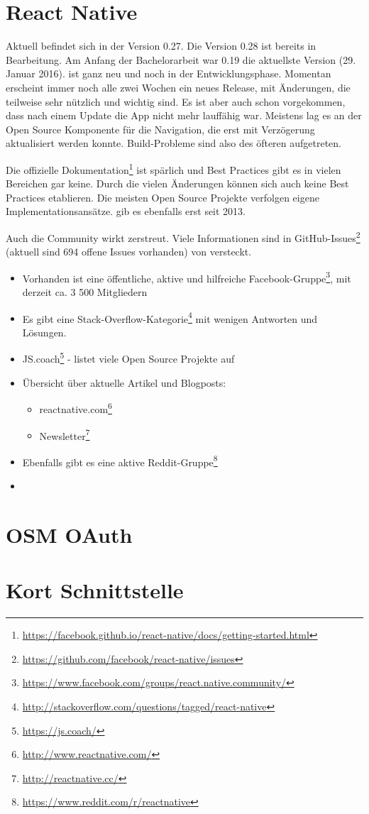 \section{React Native}
Aktuell befindet sich  in der Version 0.27.
Die Version 0.28 ist bereits in Bearbeitung.
Am Anfang der Bachelorarbeit war 0.19 die aktuellste Version (29. Januar 2016).
 ist ganz neu und noch in der Entwicklungsphase.
Momentan erscheint immer noch alle zwei Wochen ein neues Release, mit Änderungen, die teilweise sehr nützlich und wichtig sind.
Es ist aber auch schon vorgekommen, dass nach einem Update die App nicht mehr lauffähig war.
Meistens lag es an der Open Source Komponente für die Navigation, die erst mit Verzögerung aktualisiert werden konnte.
Build-Probleme sind also des öfteren aufgetreten.

Die offizielle Dokumentation\footnote{\url{https://facebook.github.io/react-native/docs/getting-started.html}} ist spärlich und Best Practices gibt es in vielen Bereichen gar keine.
Durch die vielen Änderungen können sich auch keine Best Practices etablieren.
 Die meisten Open Source Projekte verfolgen eigene Implementationsansätze.
 gib es ebenfalls erst seit 2013.

Auch die Community wirkt zerstreut. 
Viele Informationen sind in GitHub-Issues\footnote{\url{https://github.com/facebook/react-native/issues}} (aktuell sind 694 offene Issues vorhanden) von  versteckt.

\begin{itemize}
	\item Vorhanden ist eine öffentliche, aktive und hilfreiche Facebook-Gruppe\footnote{\url{https://www.facebook.com/groups/react.native.community/}}, mit derzeit ca. 3 500 Mitgliedern
	\item Es gibt eine Stack-Overflow-Kategorie\footnote{\url{http://stackoverflow.com/questions/tagged/react-native}} mit wenigen Antworten und Lösungen.
	\item JS.coach\footnote{\url{https://js.coach/}} - listet viele Open Source Projekte auf
	\item Übersicht über aktuelle Artikel und Blogposts: 
	\begin{itemize}
		\item reactnative.com\footnote{\url{http://www.reactnative.com/}}
		\item {} Newsletter\footnote{\url{http://reactnative.cc/}}
	\end{itemize}
	\item Ebenfalls gibt es eine aktive Reddit-Gruppe\footnote{\url{https://www.reddit.com/r/reactnative}}
	\item 
\end{itemize}


\section{OSM OAuth}


\section{Kort Schnittstelle}


